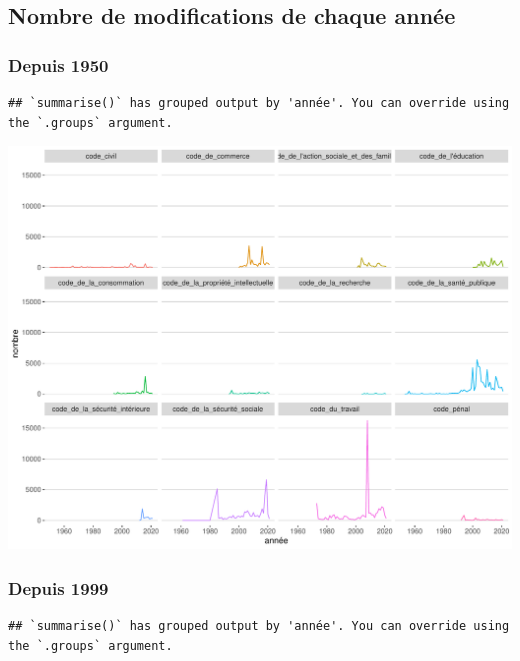 \documentclass[
  oneside]{book}
\begin{document}
\hypertarget{nombre-de-modifications-de-chaque-annuxe9e}{%
\subsection{Nombre de modifications de chaque année}\label{nombre-de-modifications-de-chaque-annuxe9e}}

\hypertarget{depuis-1950-1}{%
\subsubsection{Depuis 1950}\label{depuis-1950-1}}

\begin{verbatim}
## `summarise()` has grouped output by 'année'. You can override using the `.groups` argument.
\end{verbatim}

\includegraphics{05-images_files/figure-latex/unnamed-chunk-1-1.pdf}

\hypertarget{depuis-1999}{%
\subsubsection{Depuis 1999}\label{depuis-1999}}

\begin{verbatim}
## `summarise()` has grouped output by 'année'. You can override using the `.groups` argument.
\end{verbatim}
\end{document}
